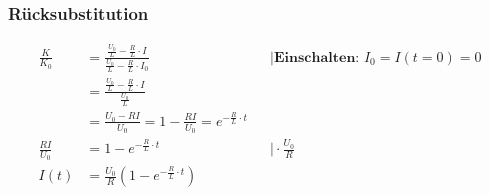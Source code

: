 \documentclass{article}
\begin{document}
	\subsubsection*{Rücksubstitution}
	\begin{align}
		\frac{K}{K_0} &= \frac{\frac{U_0}{L} - \frac{R}{L} \cdot I} 
		{\frac{U_0}{L} - \frac{R}{L} \cdot I_0}
		&&\mid \textbf{Einschalten: } I_0 = I (t=0) = 0\\
		&=\frac{\frac{U_0}{L} - \frac{R}{L} \cdot I}{\frac{U_0}{L} }\\
		&= \frac{U_0 - RI}{U_0} = 1 - \frac{RI}{U_0} = e^{- \frac{R}{L} \cdot t}\\
		\frac{RI}{U_0} &= 1 - e^{- \frac{R}{L} \cdot t}
		&&\mid \cdot \frac{U_0}{R}\\
		I(t) &= \frac{U_0}{R} \left(1 - e^{- \frac{R}{L} \cdot t}\right)
	\end{align}
\end{document}
